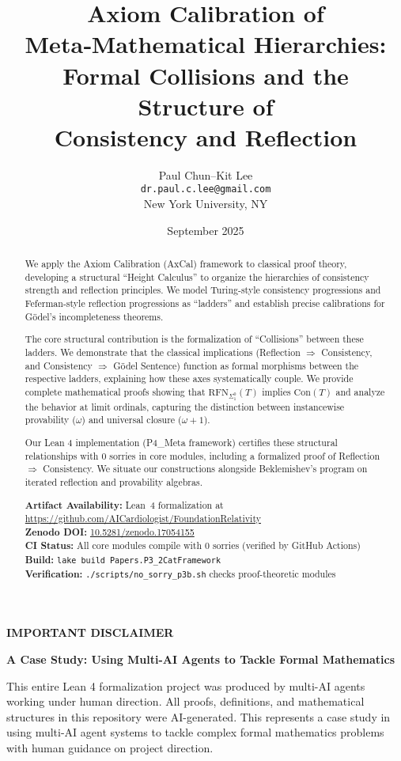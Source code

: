 \documentclass[11pt]{article}
\title{Axiom Calibration of Meta‑Mathematical Hierarchies:\\
Formal Collisions and the Structure of\\
Consistency and Reflection}
\author{Paul Chun--Kit Lee\\
\texttt{dr.paul.c.lee@gmail.com}\\
New York University, NY}
\date{September 2025}
\newcommand{\Con}{\mathrm{Con}}
\newcommand{\RFNSigOne}{\mathrm{RFN}_{\Sigma^0_1}}
\begin{document}
\maketitle

\begin{abstract}
We apply the Axiom Calibration (AxCal) framework to classical proof theory, developing a structural ``Height Calculus'' to organize the hierarchies of consistency strength and reflection principles. We model Turing-style consistency progressions and Feferman-style reflection progressions as ``ladders'' and establish precise calibrations for Gödel's incompleteness theorems.

The core structural contribution is the formalization of ``Collisions'' between these ladders. We demonstrate that the classical implications (Reflection $\Rightarrow$ Consistency, and Consistency $\Rightarrow$ Gödel Sentence) function as formal morphisms between the respective ladders, explaining how these axes systematically couple. We provide complete mathematical proofs showing that $\RFNSigOne(T)$ implies $\Con(T)$ and analyze the behavior at limit ordinals, capturing the distinction between instancewise provability ($\omega$) and universal closure ($\omega+1$).

Our Lean 4 implementation (P4\_Meta framework) certifies these structural relationships with 0 sorries in core modules, including a formalized proof of Reflection $\Rightarrow$ Consistency. We situate our constructions alongside Beklemishev's program on iterated reflection and provability algebras.

\vspace{1em}
\noindent\textbf{Artifact Availability:} Lean~4 formalization at \url{https://github.com/AICardiologist/FoundationRelativity}\\
\textbf{Zenodo DOI:} \href{https://doi.org/10.5281/zenodo.17054155}{10.5281/zenodo.17054155}\\
\textbf{CI Status:} All core modules compile with 0 sorries (verified by GitHub Actions)\\
\textbf{Build:} \texttt{lake build Papers.P3\_2CatFramework}\\
\textbf{Verification:} \texttt{./scripts/no\_sorry\_p3b.sh} checks proof-theoretic modules
\end{abstract}

\begin{mdframed}[backgroundcolor=gray!10, linewidth=0pt]
\textbf{IMPORTANT DISCLAIMER}

\textbf{A Case Study: Using Multi-AI Agents to Tackle Formal Mathematics}

This entire Lean 4 formalization project was produced by multi-AI agents working under human direction. All proofs, definitions, and mathematical structures in this repository were AI-generated. This represents a case study in using multi-AI agent systems to tackle complex formal mathematics problems with human guidance on project direction.
\end{mdframed}
\end{document}
